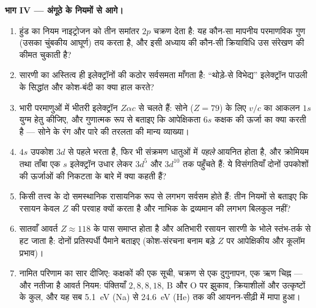 \begin{problem}[{सप्ताहांत समस्या --- तीन क्वांटम नियम पूरा रसायन
गढ़ते हैं}]
\medskip\noindent\textbf{भाग IV --- अंगूठे के नियमों से आगे।}
\begin{enumerate}[resume]
  \item हुंड का नियम नाइट्रोजन को तीन समांतर $2p$ चक्रण देता है:
        यह कौन-सा मापनीय परमाणविक गुण (उसका चुंबकीय आघूर्ण) तय
        करता है, और इसी अध्याय की कौन-सी क्रियाविधि उस संरेखण की
        कीमत चुकाती है?
  \item सारणी का अस्तित्व ही इलेक्ट्रॉनों की कठोर सर्वसमता माँगता
        है: ``थोड़े-से विभेद्य'' इलेक्ट्रॉन पाउली के सिद्धांत और
        कोश-बंदी का क्या हाल करते?
  \item भारी परमाणुओं में भीतरी इलेक्ट्रॉन $Z\alpha c$ से चलते हैं:
        सोने ($Z = 79$) के लिए $v/c$ का आकलन $1s$ युग्म हेतु कीजिए,
        और गुणात्मक रूप से बताइए कि आपेक्षिकता $6s$ कक्षक की ऊर्जा
        का क्या करती है --- सोने के रंग और पारे की तरलता की मान्य
        व्याख्या।
  \item $4s$ उपकोश $3d$ से पहले भरता है, फिर भी संक्रमण धातुओं में
        \emph{पहले} आयनित होता है, और क्रोमियम तथा ताँबा एक $s$
        इलेक्ट्रॉन उधार लेकर $3d^5$ और $3d^{10}$ तक पहुँचते हैं:
        ये विसंगतियाँ दोनों उपकोशों की ऊर्जाओं की निकटता के बारे में
        क्या कहती हैं?
  \item किसी तत्त्व के दो समस्थानिक रासायनिक रूप से लगभग सर्वसम
        होते हैं: तीन नियमों से बताइए कि रसायन केवल $Z$ की परवाह
        क्यों करता है और नाभिक के द्रव्यमान की लगभग बिलकुल नहीं?
  \item सातवाँ आवर्त $Z \approx 118$ के पास समाप्त होता है और
        अतिभारी रसायन सारणी के भोले स्तंभ-तर्क से हट जाता है: दोनों
        प्रतिस्पर्धी पैमाने बताइए (कोश-संरचना बनाम बड़े $Z$ पर
        आपेक्षिकीय और कूलॉम प्रभाव)।
  \item नामित परिणाम का सार दीजिए: कक्षकों की एक सूची, चक्रण से एक
        दुगुनापन, एक ऋण चिह्न --- और नतीजा है आवर्त नियम: पंक्तियाँ
        $2, 8, 8, 18$, B और O पर झुकाव, क्रियाशीलों और उत्कृष्टों
        के कुल, और यह सब \qty{5.1}{eV} (Na) से \qty{24.6}{eV} (He)
        तक की आयनन-सीढ़ी में मापा हुआ।
\end{enumerate}
\end{problem}

